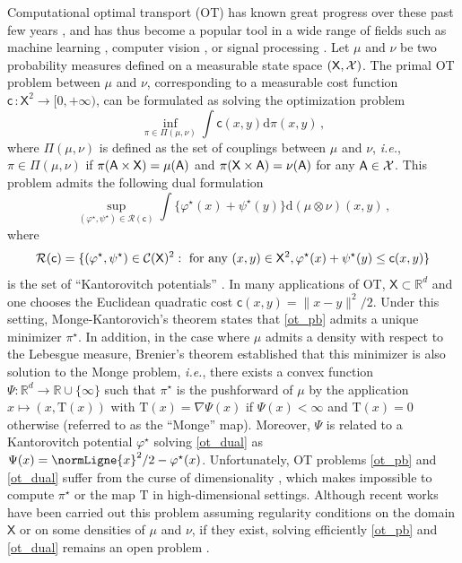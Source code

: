 \documentclass[final,12pt]{colt2023} %
\def\msx{\mathsf{X}}
\def\cost{\mathsf{c}}
\def\rset{\mathbb{R}}
\def\psiMonge{\Psi}
\def\TMonge{\mathrm{T}}
\def\ie{\textit{i.e.}}
\newcommand{\bbRD}{\mathbb{R}^d}
\newcommand{\De}{\mathrm{d}}
\def\rset{\mathbb{R}}
\def\ie{\textit{i.e.}}
\def\varphistar{\varphi^\star}
\def\psistar{\psi^{\star}}
\begin{document}
Computational optimal transport (OT) has known great progress over these past few years \citep{peyre2019computational}, and has thus become a popular tool in a wide range of fields such as machine learning \citep{adler2017learning, arjovsky2017wasserstein}, computer vision \citep{dominitz2009texture, solomon2015convolutional}, or signal processing \citep{kolouri2017optimal}. Let $\mu$ and $\nu$ be two probability measures defined on a measurable state space $(\msx,\mcx)$. The primal OT problem \citep{villani2008optimal} between $\mu$ and $\nu$, corresponding to a measurable cost function $\cost\, : \msx^2 \to [0, +\infty)$, can be formulated as solving the optimization problem
\begin{equation}
  \label{ot_pb}
    \inf_{\pi \in \Pi(\mu, \nu)}\int \cost(x,y)\De \pi(x,y) \, ,
\end{equation}
where $\Pi(\mu, \nu)$ is defined as the set of couplings between $\mu$ and $\nu$, \ie, $\pi \in \Pi(\mu,\nu)$ if $\pi(\msa \times \msx) = \mu(\msa)$ and $\pi(\msx\times \msa)= \nu(\msa)$ for any $\mathsf{A} \in \mathcal{X}$. This problem admits the following dual formulation
\begin{equation}
  \label{ot_dual}
    \sup_{(\varphistar,\psistar) \in \mathcal{R}(\cost)}\int \{\varphistar(x)+\psistar(y)\}\De (\mu \otimes \nu)(x,y) \, ,
\end{equation}
where $$\mathcal{R}(\cost)=\{(\varphistar, \psistar)\in \mathcal{C}(\msx)^2: \forany (x,y)\in \msx^2, \varphistar(x) +\psistar(y) \leq \cost(x,y)\}$$ is the set of ``Kantorovitch potentials'' \citep{kellerer1984duality}. In many applications of OT, $\msx\subset\bbRD$ and one chooses the Euclidean quadratic cost $\cost(x,y)=\|x-y\|^2/2$.  Under this setting, Monge-Kantorovich's theorem states that \eqref{ot_pb} admits a unique minimizer $\pi^\star$. In addition, in the case where $\mu$ admits a density with respect to the Lebesgue measure, Brenier's theorem \citep{brenier1991polar} established that this minimizer is also solution to the Monge problem, \ie, there exists a convex function $\psiMonge : \rset^d \to \rset \cup \{\infty\}$ such that $\pi^\star$ is the pushforward of $\mu$ by the application $x \mapsto (x,\TMonge(x))$ with $\TMonge(x) = \nabla \psiMonge(x)$ if $\psiMonge(x) < \infty$ and $\TMonge(x) = 0$ otherwise (referred to as the ``Monge'' map). Moreover, $\psiMonge$ is related to a Kantorovitch potential $\varphistar$ solving \eqref{ot_dual} as $\psiMonge(x)=\normLigne{x}^2/2-\varphistar(x)$.  Unfortunately, OT problems \eqref{ot_pb} and \eqref{ot_dual} suffer from the curse of dimensionality \citep{papadakis2014optimal, niles2022estimation}, which makes impossible to compute $\pi^\star$ or the map $\TMonge$ in high-dimensional settings. Although recent works have been carried out this problem assuming regularity conditions on the domain $\msx$ or on some densities of $\mu$ and $\nu$, if they exist, solving efficiently \eqref{ot_pb} and \eqref{ot_dual} remains an open problem \citep{benamou2014numerical, niles2022estimation, forrow2019statistical}.
\end{document}

